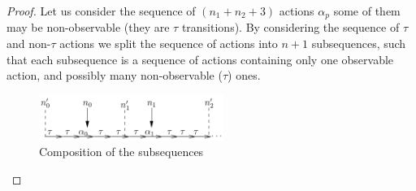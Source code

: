 \documentclass{lmcs}
\begin{document}
\begin{proof}
Let us consider the sequence of $(n_1+n_2+3)$  actions $\alpha_p$ some of them may be non-observable (they are $\tau$ transitions). By considering the sequence of $\tau$ and non-$\tau$ actions we split the sequence of actions into $n+1$ subsequences, such that each subsequence is a sequence of actions containing  only one observable action, and possibly many non-observable ($\tau$) ones. 

\begin{figure}
\begin{center}
\includegraphics[width=6cm]{XFIG/proof-explain}
\end{center}\caption{Composition of the subsequences}\label{figproof}
\end{figure}


\end{proof}
\end{document}
